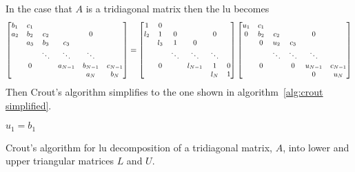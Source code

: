 \documentclass[a4paper]{article}
\begin{document}
    In the case that \(A\) is a tridiagonal matrix then the \gls{lu} becomes
    \[\small
        \begin{bmatrix}
        	b_1 & c_1 &        &         &         &         \\
        	a_2 & b_2 & c_2    &         & 0       &         \\
        	    & a_3 & b_3    & c_3     &         &         \\
        	    &     & \ddots & \ddots  & \ddots  &         \\
        	    & 0   &        & a_{N-1} & b_{N-1} & c_{N-1} \\
        	    &     &        &         & a_N     & b_N
        \end{bmatrix}
        =
        \begin{bmatrix}
        	1   & 0   &        &         &        &   \\
        	l_2 & 1   & 0      &         & 0      &   \\
        	    & l_3 & 1      & 0       &        &   \\
        	    &     & \ddots & \ddots  & \ddots &   \\
        	    & 0   &        & l_{N-1} & 1      & 0 \\
        	    &     &        &         & l_N    & 1
        \end{bmatrix}
        \begin{bmatrix}
        	u_1 & c_1 &        &        &         &         \\
        	0   & b_2 & c_2    &        & 0       &         \\
        	    & 0   & u_2    & c_3    &         &         \\
        	    &     & \ddots & \ddots & \ddots  &         \\
        	    & 0   &        & 0      & u_{N-1} & c_{N-1} \\
        	    &     &        &        & 0       & u_N
        \end{bmatrix}
    \]
    Then Crout's algorithm simplifies to the one shown in algorithm~\ref{alg:crout simplified}.
    \begin{algorithm}[ht]
        \(\displaystyle u_1 = b_1\)\;
        \caption{Crout's algorithm for \gls{lu} decomposition of a tridiagonal matrix, \(A\), into lower and upper triangular matrices \(L\) and \(U\).}
        \label{alg:crout simplified}
    \end{algorithm}
\end{document}

